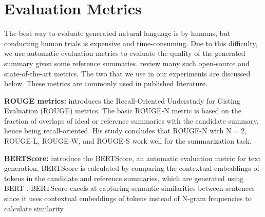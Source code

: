 \section{Evaluation Metrics}
\label{sec:metrics}

The best way to evaluate generated natural language is by humans, but conducting human trials is expensive and time-consuming.
Due to this difficulty, we use automatic evaluation metrics to evaluate the quality of the generated summary given some reference summaries.
\citet{fabbri2021summeval} review many such open-source and state-of-the-art metrics.
The two that we use in our experiments are discussed below.
These metrics are commonly used in published literature.

\textbf{ROUGE metrics:} \citet{lin-2004-rouge} introduces the Recall-Oriented Understudy for Gisting Evaluation (ROUGE) metrics.
The basic ROUGE-N metric is based on the fraction of overlaps of ideal or reference summaries with the candidate summary, hence being recall-oriented.
His study concludes that ROUGE-N with $\text{N} = 2$, ROUGE-L, ROUGE-W, and ROUGE-S work well for the summarization task.

\textbf{BERTScore:} \citet{zhang2019bertscore} introduce the BERTScore, an automatic evaluation metric for text generation.
BERTScore is calculated by comparing the contextual embeddings of tokens in the candidate and reference summaries, which are generated using BERT \cite{devlin2018bert}.
BERTScore excels at capturing semantic similarities between sentences since it uses contextual embeddings of tokens instead of N-gram frequencies to calculate similarity.
